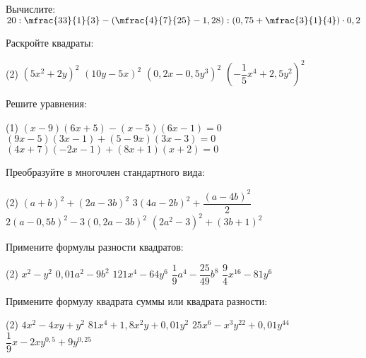 \begin{exam}
	\begin{listofex}
		\item Вычислите: \( 20 : \mfrac{33}{1}{3} - \left( \mfrac{4}{7}{25} - 1,28 \right) : \left( 0,75 + \mfrac{3}{1}{4} \right) \cdot 0,2 \)
		\item Раскройте квадраты:
		\begin{tasks}(2)
			\task \( (5x^2+2y)^2\)
			\task \( (10y-5x)^2 \)
			\task \( (0,2x-0,5y^3)^2 \)
			\task \( \left(-\dfrac{1}{5}x^4+2,5y^2\right)^2 \)
		\end{tasks}
		\item Решите уравнения:
		\begin{tasks}(1)
			\task \( (x-9)(6x+5)-(x-5)(6x-1)=0 \)
			\task \( (9x-5)(3x-1)+(5-9x)(3x-3)=0 \)
			\task \( (4x+7)(-2x-1)+(8x+1)(x+2)=0 \)
		\end{tasks}
		\item Преобразуйте в многочлен стандартного вида:
		\begin{tasks}(2)
			\task \( (a+b)^2+(2a-3b)^2 \)
			\task \( 3(4a-2b)^2+\dfrac{(a-4b)^2}{2} \)
			\task \( 2(a-0,5b)^2-3(0,2a-3b)^2 \)
			\task \( (2a^2-3)^2+(3b+1)^2 \)
		\end{tasks}
		\item Примените формулы разности квадратов:
		\begin{tasks}(2)
			\task \( x^2-y^2 \)
			\task \( 0,01a^2-9b^2 \)
			\task \( 121x^4-64y^6 \)
			\task \( \dfrac{1}{9}a^4-\dfrac{25}{49}b^8 \)
			\task \( \dfrac{9}{4}x^{16}-81y^6 \)
		\end{tasks}
		\item Примените формулу квадрата суммы или квадрата разности:
		\begin{tasks}(2)
			\task \( 4x^2-4xy+y^2 \)
			\task \( 81x^4+1,8x^2y+0,01y^2 \)
			\task \( 25x^6-x^3y^{22}+0,01y^{44} \)
			\task \( \dfrac{1}{9}x-2xy^{0,5}+9y^{0,25} \)
		\end{tasks}
	\end{listofex}
\end{exam}

